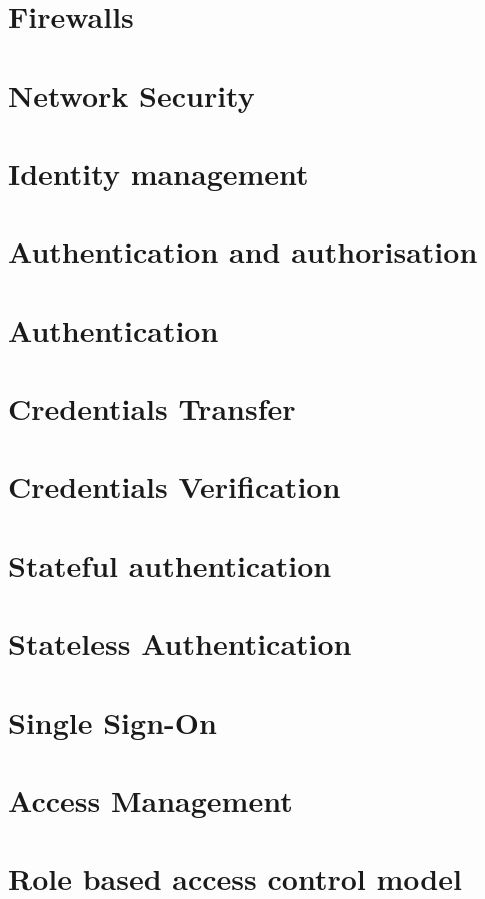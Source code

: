 \documentclass[11pt]{article}
\begin{document}
\section{Firewalls}

\section{Network Security}

\section{Identity management}

\section{Authentication and authorisation}

\section{Authentication}

\section{Credentials Transfer}

\section{Credentials Verification}

\section{Stateful authentication}

\section{Stateless Authentication}

\section{Single Sign-On}

\section{Access Management}

\section{Role based access control model}
\end{document}
